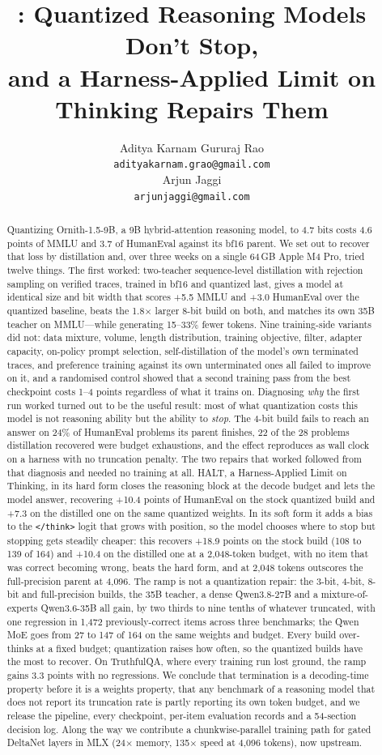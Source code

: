 \documentclass[11pt]{article}
\title{\HALT{}: Quantized Reasoning Models Don't Stop,\\
and a Harness-Applied Limit on Thinking Repairs Them}
\author{%
  Aditya Karnam Gururaj Rao\\
  \texttt{adityakarnam.grao@gmail.com}\\[0.6em]
  Arjun Jaggi\\
  \texttt{arjunjaggi@gmail.com}\\
}
\date{}
\newcommand{\HALT}{\textsc{HALT}}
\newcommand{\Student}{Ornith-1.5-9B}
\newcommand{\Forcinghighlight}{+10.4 points of HumanEval on the stock quantized build and +7.3 on the distilled one}
\newcommand{\Softhighlight}{+18.9 points on the stock build (108 to 139 of 164) and +10.4 on the distilled one at a 2{,}048-token budget, with no item that was correct becoming wrong}
\newcommand{\Generalhighlight}{the 3-bit, 4-bit, 8-bit and full-precision builds, the 35B teacher, a dense Qwen3.8-27B and a mixture-of-experts Qwen3.6-35B all gain, by two thirds to nine tenths of whatever truncated, with one regression in 1{,}472 previously-correct items across three benchmarks; the Qwen MoE goes from 27 to 147 of 164 on the same weights and budget}
\begin{document}
\maketitle

\begin{abstract}
Quantizing \Student{}, a 9B hybrid-attention reasoning model, to 4.7 bits costs
4.6 points of MMLU and 3.7 of HumanEval against its bf16 parent.  We set out to
recover that loss by distillation and, over three weeks on a single 64\,GB
Apple M4 Pro, tried twelve things.  The first worked: two-teacher sequence-level
distillation with rejection sampling on verified traces, trained in bf16 and
quantized last, gives a model at identical size and bit width that scores
+5.5 MMLU and +3.0 HumanEval over the quantized baseline, beats the
1.8$\times$ larger 8-bit build on both, and matches its own 35B teacher on
MMLU---while generating 15--33\% fewer tokens.  Nine training-side variants did
not: data mixture, volume, length distribution, training objective, filter,
adapter capacity, on-policy prompt selection, self-distillation of the
model's own terminated traces, and preference training against its own
unterminated ones all failed to improve on it, and a randomised control showed
that a second training pass from the best checkpoint costs 1--4 points
regardless of what it trains on.  Diagnosing \emph{why} the
first run worked turned out to be the useful result: most of what quantization
costs this model is not reasoning ability but the ability to \emph{stop}.  The
4-bit build fails to reach an answer on 24\% of HumanEval problems its parent
finishes, 22 of the 28 problems distillation recovered were budget exhaustions,
and the effect reproduces as wall clock on a harness with no truncation penalty.
The two repairs that worked followed from that diagnosis and needed no training
at all.  \HALT{}, a Harness-Applied Limit on Thinking, in its hard form closes
the reasoning block at the decode budget and lets the model answer, recovering
\Forcinghighlight{} on the same quantized weights.  In its soft form it adds a
bias to the \texttt{</think>} logit that grows with position, so the model
chooses where to stop but stopping gets steadily cheaper: this recovers
\Softhighlight{}, beats the hard form, and at 2{,}048 tokens outscores the
full-precision parent at 4{,}096.  The ramp is not a quantization repair:
\Generalhighlight{}.  Every build over-thinks at a fixed budget; quantization
raises how often, so the quantized builds have the most to recover.  On
TruthfulQA, where every training run lost ground, the ramp gains 3.3 points with
no regressions.  We conclude that termination is a decoding-time property before it is a weights
property, that any benchmark of a reasoning model that does not report its
truncation rate is partly reporting its own token budget, and we
release the pipeline, every checkpoint, per-item evaluation records and a
54-section decision log.  Along the way we contribute a chunkwise-parallel
training path for gated DeltaNet layers in MLX (24$\times$ memory, 135$\times$
speed at 4{,}096 tokens), now upstream.
\end{abstract}
\end{document}
